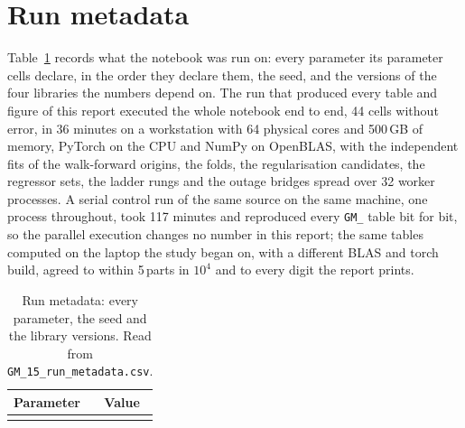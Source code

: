 \documentclass[11pt,a4paper]{article}
\begin{document}
\section{Run metadata}
\label{sec:metadata}

Table~\ref{tab:metadata} records what the notebook was run on: every
parameter its parameter cells declare, in the order they declare them, the
seed, and the versions of the four libraries the numbers depend on. The run
that produced every table and figure of this report executed the whole
notebook end to end, 44 cells without error, in 36 minutes on a workstation
with 64 physical cores and 500\,GB of memory, PyTorch on the CPU and NumPy on
OpenBLAS, with the independent fits of the walk-forward origins, the folds,
the regularisation candidates, the regressor sets, the ladder rungs and the
outage bridges spread over 32 worker processes. A serial control run of the
same source on the same machine, one process throughout, took 117 minutes
and reproduced every \texttt{GM\_} table bit for bit, so the parallel
execution changes no number in this report; the same tables computed on the
laptop the study began on, with a different BLAS and torch build, agreed to
within 5\,parts in $10^{4}$ and to every digit the report prints.

\begin{table}[H]
\centering
\caption{Run metadata: every parameter, the seed and the library versions.
Read from \texttt{GM\_15\_run\_metadata.csv}.}
\label{tab:metadata}
{\scriptsize
\begin{tabular}{l p{10.2cm}}
\toprule
Parameter & Value \\
\midrule
\\
\bottomrule
\end{tabular}}
\end{table}
\end{document}
